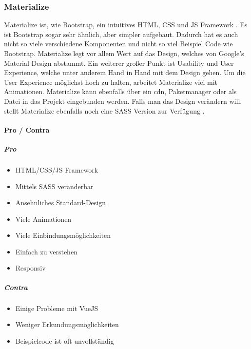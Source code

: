 		\subsubsection{Materialize}
		\label{chapter:study-frontend-frameworks-materialize}
		Materialize ist, wie Bootstrap, ein intuitives HTML, CSS und JS Framework \cite{materialize-intro}. Es ist Bootstrap sogar sehr ähnlich, aber simpler aufgebaut. Dadurch hat es auch nicht so viele verschiedene Komponenten und nicht so viel Beispiel Code wie Bootstrap. Materialize legt vor allem Wert auf das Design, welches von Google's Material Design abstammt. Ein weiterer großer Punkt ist Usability und User Experience, welche unter anderem Hand in Hand mit dem Design gehen. Um die User Experience möglichst hoch zu halten, arbeitet Materialize viel mit Animationen. Materialize kann ebenfalls über ein \Gls{cdn}, Paketmanager oder als Datei in das Projekt eingebunden werden. Falls man das Design verändern will, stellt Materialize ebenfalls noch eine SASS Version zur Verfügung \cite{WebDocMaterialize}.
		\paragraph{Pro / Contra}
		\subparagraph{Pro}
		\begin{itemize}
			\item HTML/CSS/JS Framework
			\item Mittels SASS veränderbar
			\item Ansehnliches Standard-Design 
			\item Viele Animationen
			\item Viele Einbindungsmöglichkeiten
			\item Einfach zu verstehen
			\item Responsiv
		\end{itemize}
	\label{list:materializepro}
		\subparagraph{Contra}
		\begin{itemize}
			\item Einige Probleme mit VueJS
			\item Weniger Erkundungsmöglichkeiten
			\item Beispielcode ist oft unvollständig
		\end{itemize}
	\label{list:materializecontra}
	
